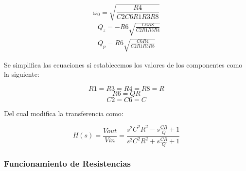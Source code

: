 \begin{equation}
\label{ej1eq5}
    \omega_0 = \sqrt{\frac{R4}{C2C6R1R3R8}}
\end{equation}
\begin{equation}
\begin{split}
\label{ej1eq6}
    &Q_z = -R6 \sqrt{\frac{C6R8}{C2R1R3R4}} \\
    &Q_p = R6 \sqrt{\frac{C6R4}{C2R1R3R8}}    
\end{split}
\end{equation}

Se simplifica las ecuaciones si establecemos los valores de los componentes como la siguiente:

$$R1 = R3 = R4 = R8 = R$$
$$R6 = Q  R $$
$$C2 = C6 = C$$

Del cual modifica la transferencia como:

\begin{equation}
    \label{ej1eq7}
     H(s) = \frac{Vout}{Vin} = \frac{s^2C^2R^2 - s\frac{CR}{Q} + 1}{s^2C^2R^2 + s\frac{CR}{Q} + 1}
\end{equation}

\subsubsection{Funcionamiento de Resistencias}

